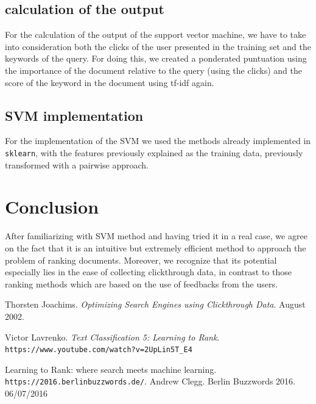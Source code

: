 \documentclass{article}
\begin{document}
\subsection{calculation of the output}
For the calculation of the output of the support vector machine, we have to take into consideration both the clicks of the user presented in the training set and the keywords of the query. For doing this, we created a ponderated puntuation using the importance of the document relative to the query (using the clicks) and the score of the keyword in the document using tf-idf again.

\subsection{SVM implementation}
For the implementation of the SVM we used the methods already implemented in \texttt{sklearn}, with the features previously explained as the training data, previously transformed with a pairwise approach.

\section{Conclusion}
After familiarizing with SVM method and having tried it in a real case, we agree on the fact that it is an intuitive but extremely efficient method to approach the problem of ranking documents. Moreover, we recognize that its potential especially lies in the ease of collecting clickthrough data, in contrast to those ranking methods which are based on the use of feedbacks from the users.

\begin{thebibliography}{9}
Thorsten Joachims.
\textit{Optimizing Search Engines using Clickthrough Data}. 
August 2002.

Victor Lavrenko.
\textit{Text Classification 5: Learning to Rank}.
\texttt{https://www.youtube.com/watch?v=2UpLin5T_E4}

Learning to Rank: where search meets machine learning.
\texttt{https://2016.berlinbuzzwords.de/}.
Andrew Clegg. Berlin Buzzwords 2016. 06/07/2016

\end{thebibliography}
\end{document}
